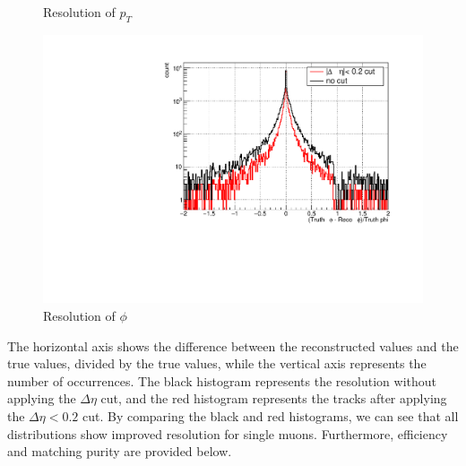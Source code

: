 \begin{figure}[H]
\begin{minipage}{0.45\textwidth}
                            \caption{Resolution of $p_T$}
                            \label{Analysis:Matching:eta resolution}
                        \end{minipage}
                    \end{figure}
                    \begin{figure}[H]
                        \centering
                        \includegraphics[keepaspectratio, scale=0.4]{fig/3_5_6_reso_phi.pdf} 
                        \caption{Resolution of $\phi$}
                        \label{Analysis:Matching:phi resolution}
                    \end{figure}
                The horizontal axis shows the difference between the reconstructed values and the true values, divided by the true values, while the vertical axis represents the number of occurrences. The black histogram represents the resolution without applying the $\Delta \eta$ cut, and the red histogram represents the tracks after applying the $\Delta \eta < 0.2$ cut. By comparing the black and red histograms, we can see that all distributions show improved resolution for single muons. Furthermore, efficiency and matching purity are provided below.
